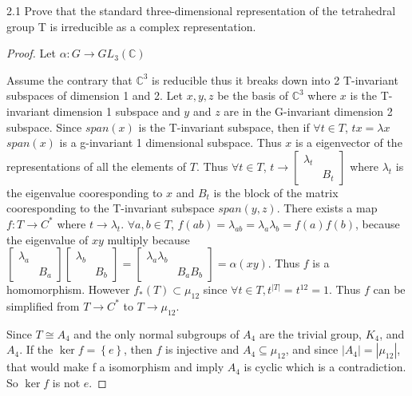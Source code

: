 \documentclass{article}
\newcommand{\C}{\mathbb{C}}
\begin{document}
\begin{PROB}{2.1}\label{Problem 2.1.}
    Prove that the standard three-dimensional representation of the tetrahedral group T is irreducible as a complex representation.
\end{PROB}
\begin{proof}
    Let $\alpha: G \to GL_3(\C)$ 

    Assume the contrary that $\C^3$ is reducible thus it breaks down into 2 T-invariant subspaces of dimension 1 and 2. Let $x, y, z$ be the basis of $\C^3$ where $x$ is the T-invariant dimension 1 subspace and $y$ and $z$ are in the G-invariant dimension 2 subspace. Since $span(x)$ is the T-invariant subspace, then if $\forall t \in T$, $tx = \lambda x$ $span(x)$ is a g-invariant 1 dimensional subspace. Thus $x$ is a eigenvector of the representations of all the elements of $T$. Thus $\forall t \in T$, $t \to \begin{bmatrix}
        \lambda_t \\
        & B_t
    \end{bmatrix}$ where $\lambda_t$ is the eigenvalue cooresponding to $x$ and $B_t$ is the block of the matrix cooresponding to the T-invariant subspace $span(y, z)$. There exists a map $f: T \to C^*$ where $t \to \lambda_t$. $\forall a,b \in T$, $f(ab) = \lambda_{ab} = \lambda_{a}\lambda_b = f(a)f(b)$, because the eigenvalue of $xy$ multiply because $\begin{bmatrix}
        \lambda_a \\ & B_a
    \end{bmatrix}\begin{bmatrix}
        \lambda_b \\ & B_b
    \end{bmatrix} = \begin{bmatrix}
        \lambda_{a}\lambda_b \\ & B_{a}B_b
    \end{bmatrix} = \alpha(xy)$. Thus $f$ is a homomorphism. However $f_*(T) \subset \mu_{12}$ since $\forall t \in T, t^{|T|} = t^{12} = 1$. Thus $f$ can be simplified from $T \to C^*$ to $T \to \mu_{12}$.       
    
    Since $T \cong A_4$ and the only normal subgroups of $A_4$ are the trivial group, $K_4$, and $A_4$. If the $\ker f = \left\{ e \right\}$, then $f$ is injective and $A_4 \subseteq \mu_{12}$, and since $|A_4| = |\mu_{12}|$, that would make f a isomorphism and imply $A_4$ is cyclic which is a contradiction. So $\ker f$ is not $e$.
    

\end{proof}
\end{document}
